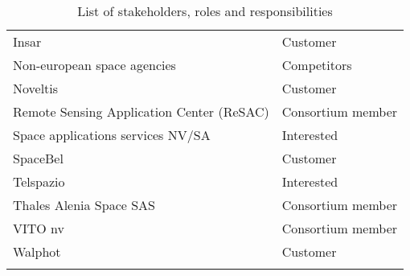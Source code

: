 \begin{center}
\begin{longtable}{ll}
Insar&Customer\\
Non-european space agencies&Competitors\\
Noveltis&Customer\\
Remote Sensing Application Center (ReSAC)                               & Consortium member \\
Space applications services NV/SA&Interested\\
SpaceBel&Customer\\
Telspazio&Interested\\
Thales Alenia Space SAS             & Consortium member                                                                       \\ 
VITO nv                             & Consortium member \\
Walphot&Customer\\

 \bottomrule[2pt]

\caption{List of stakeholders, roles and responsibilities}
\label{table_stakeholders}
\end{longtable}

\end{center}
